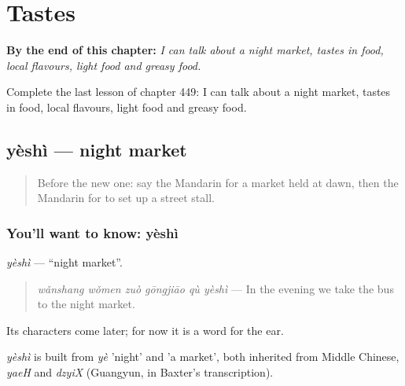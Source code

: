 
\chapter{Tastes}
\label{ch:zh-tastes}

\begin{chapteropening}
\textbf{By the end of this chapter:} \emph{I can talk about a night market, tastes in food, local flavours, light food and greasy food.}

Complete the last lesson of chapter 449: I can talk about a night market, tastes in food, local flavours, light food and greasy food.
\end{chapteropening}

\section[yèshì]{yèshì — night market}

\label{lesson:ZH-C449-yeshi}



\begin{quote}
Before the new one: say the Mandarin for a market held at dawn, then the Mandarin for to set up a street stall.
\end{quote}

\subsection*{You'll want to know: yèshì}
\emph{yèshì} — \textquotedblleft{}night market\textquotedblright{}.

\begin{quote}
\emph{wǎnshang wǒmen zuò gōngjiāo qù yèshì} — In the evening we take the bus to the night market.
\end{quote}

Its characters come later; for now it is a word for the ear.

\begin{cousinweb}
\emph{yèshì} is built from \emph{yè} 'night' and  'a market', both inherited from Middle Chinese, \emph{yaeH} and \emph{dzyiX} (Guangyun, in Baxter's transcription).
\end{cousinweb}

